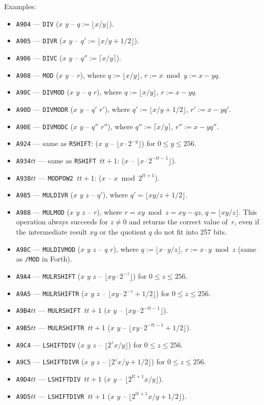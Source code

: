 \documentclass[12pt,oneside]{article}
\begin{document}
Examples:
\begin{itemize}
\item {\tt A904} --- {\tt DIV} ($x$ $y$ -- $q:=\lfloor x/y\rfloor$).
\item {\tt A905} --- {\tt DIVR} ($x$ $y$ -- $q':=\lfloor x/y+1/2\rfloor$).
\item {\tt A906} --- {\tt DIVC} ($x$ $y$ -- $q'':=\lceil x/y\rceil$).
\item {\tt A908} --- {\tt MOD} ($x$ $y$ -- $r$), where $q:=\lfloor x/y\rfloor$, $r:=x\bmod y:=x-yq$.
\item {\tt A90C} --- {\tt DIVMOD} ($x$ $y$ -- $q$ $r$), where $q:=\lfloor x/y\rfloor$, $r:=x-yq$.
\item {\tt A90D} --- {\tt DIVMODR} ($x$ $y$ -- $q'$ $r'$), where $q':=\lfloor x/y+1/2\rfloor$, $r':=x-yq'$.
\item {\tt A90E} --- {\tt DIVMODC} ($x$ $y$ -- $q''$ $r''$), where $q'':=\lceil x/y\rceil$, $r'':=x-yq''$.
\item {\tt A924} --- same as {\tt RSHIFT}: ($x$ $y$ -- $\lfloor x\cdot 2^{-y}\rfloor$) for $0\leq y\leq 256$.
\item {\tt A934$tt$} --- same as {\tt RSHIFT $tt+1$}: ($x$ -- $\lfloor x\cdot 2^{-tt-1}\rfloor$).
\item {\tt A938$tt$} --- {\tt MODPOW2 $tt+1$}: ($x$ -- $x\bmod 2^{tt+1}$).
\item {\tt A985} --- {\tt MULDIVR} ($x$ $y$ $z$ -- $q'$), where $q'=\lfloor xy/z+1/2\rfloor$.
\item {\tt A988} --- {\tt MULMOD} ($x$ $y$ $z$ -- $r$), where $r=xy\bmod z=xy-qz$, $q=\lfloor xy/z\rfloor$. This operation always succeeds for $z\neq0$ and returns the correct value of~$r$, even if the intermediate result $xy$ or the quotient $q$ do not fit into 257 bits.
\item {\tt A98C} --- {\tt MULDIVMOD} ($x$ $y$ $z$ -- $q$ $r$), where $q:=\lfloor x\cdot y/z\rfloor$, $r:=x\cdot y\bmod z$ (same as {\tt */MOD} in Forth).
\item {\tt A9A4} --- {\tt MULRSHIFT} ($x$ $y$ $z$ -- $\lfloor xy\cdot2^{-z}\rfloor$) for $0\leq z\leq 256$.
\item {\tt A9A5} --- {\tt MULRSHIFTR} ($x$ $y$ $z$ -- $\lfloor xy\cdot2^{-z}+1/2\rfloor$) for $0\leq z\leq 256$.
\item {\tt A9B4$tt$} --- {\tt MULRSHIFT $tt+1$} ($x$ $y$ -- $\lfloor xy\cdot 2^{-tt-1}\rfloor$).
\item {\tt A9B5$tt$} --- {\tt MULRSHIFTR $tt+1$} ($x$ $y$ -- $\lfloor xy\cdot 2^{-tt-1}+1/2\rfloor$).
\item {\tt A9C4} --- {\tt LSHIFTDIV} ($x$ $y$ $z$ -- $\lfloor 2^zx/y\rfloor$) for $0\leq z\leq 256$.
\item {\tt A9C5} --- {\tt LSHIFTDIVR} ($x$ $y$ $z$ -- $\lfloor 2^zx/y+1/2\rfloor$) for $0\leq z\leq 256$.
\item {\tt A9D4$tt$} --- {\tt LSHIFTDIV $tt+1$} ($x$ $y$ -- $\lfloor 2^{tt+1}x/y\rfloor$).
\item {\tt A9D5$tt$} --- {\tt LSHIFTDIVR $tt+1$} ($x$ $y$ -- $\lfloor 2^{tt+1}x/y+1/2\rfloor$).
\end{itemize}
\end{document}
